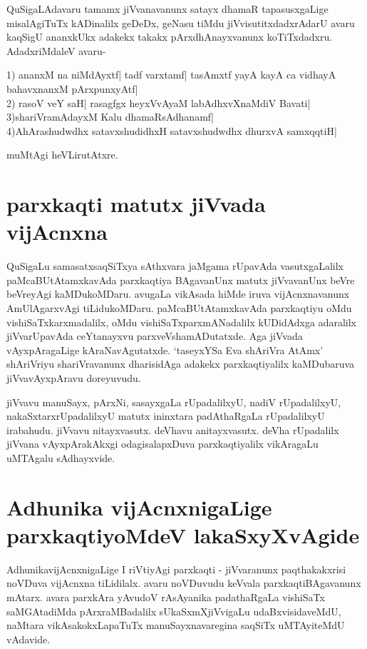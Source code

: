 QuSigaLAdavaru tamamx jiVvanavanunx satayx dhamaR tapasusxgaLige misalAgiTuTx kADinalilx geDeDx, geNasu tiMdu jiVvisutitxdadxrAdarU avaru kaqSigU ananxkUkx adakekx takakx pArxdhAnayxvanunx koTiTxdadxru. AdadxriMdaleV avaru-

1) ananxM na niMdAyxtf|\label{76} tadf varxtamf| tasAmxtf yayA kayA ca vidhayA bahavxnanxM pArxpunxyAtf|\\
2) rasoV veY saH| rasagfgx heyxVvAyaM labAdhxvX\s naMdiV Bavati|\label{76c}\\
3)shariVramAdayxM Kalu dhamaRsAdhanamf|\label{76d}\\
4)AhArashudwdhx satavxshudidhxH satavxshudwdhx dhurxvA samxqqtiH|\label{76b}

muMtAgi heVLirutAtxre.

\section*{parxkaqti matutx jiVvada vijAcnxna}

QuSigaLu samasatxsaqSiTxya sAthxvara jaMgama rUpavAda vasutxgaLalilx paMcaBUtAtamxkavAda parxkaqtiya BAgavanUnx matutx jiVvavanUnx beVre beVreyAgi kaMDukoMDaru. avugaLa vikAsada hiMde iruva vijAcnxnavanunx AmUlAgarxvAgi tiLidukoMDaru. paMcaBUtAtamxkavAda parxkaqtiyu oMdu vishiSaTxkarxmadalilx, oMdu vishiSaTxparxmANadalilx kUDidAdxga adaralilx jiVvarUpavAda ceYtanayxvu parxveVshamADutatxde. Aga jiVvada vAyxpAragaLige kAraNavAgutatxde. `taseyxYSa Eva shAriVra AtAmx'\label{76a} shAriVriyu shariVravanunx dharisidAga adakekx  parxkaqtiyalilx kaMDubaruva jiVvavAyxpAravu doreyuvudu.

jiVvavu manuSayx, pArxNi, sasayxgaLa rUpadalilxyU, nadiV rUpadalilxyU, nakaSxtarxrUpadalilxyU matutx ininxtara padAthaRgaLa rUpadalilxyU irabahudu. jiVvavu nitayxvasutx. deVhavu anitayxvasutx. deVha rUpadalilx jiVvana vAyxpArakAkxgi odagisalapxDuva parxkaqtiyalilx vikAragaLu uMTAgalu sAdhayxvide.

\section*{Adhunika vijAcnxnigaLige parxkaqtiyoMdeV lakaSxyXvAgide}

AdhunikavijAcnxnigaLige I riVtiyAgi parxkaqti - jiVvaranunx paqthakakxrisi noVDuva vijAcnxna tiLidilalx. avaru noVDuvudu keVvala parxkaqtiBAgavanunx mAtarx. avara parxkAra yAvudoV rAsAyanika padathaRgaLa vishiSaTx saMGAtadiMda pArxraMBadalilx sUkaSxmXjiVvigaLu udaBxvisidaveMdU, naMtara vikAsakokxLapaTuTx manuSayxnavaregina saqSiTx uMTAyiteMdU vAdavide.

